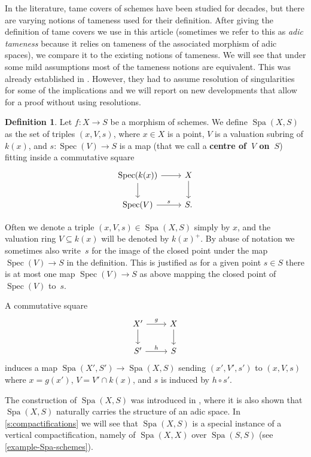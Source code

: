 \documentclass[a4paper,twoside,11pt,reqno]{amsart}
\DeclareMathOperator{\Spec}{Spec}
\DeclareMathOperator{\Spa}{Spa}
\theoremstyle{definition}
\newtheorem{defi}[thm]{Definition}
\numberwithin{equation}{subsection}
\begin{document}
In the literature, tame covers of schemes have been studied for decades, but there are varying notions of tameness used for their definition. 
After giving the definition of tame covers we use in this article (sometimes we refer to this as \emph{adic tameness} because it relies on tameness of the associated morphism of adic spaces), we compare it to the existing notions of tameness.
We will see that under some mild assumptions most of the tameness notions are equivalent.
This was already established in \cite{KerzSchmidt2010:DifferentNotionsTameness}.
However, they had to assume resolution of singularities for some of the implications and we will report on new developments that allow for a proof without using resolutions.

\begin{defi}
\label{defi:Spa for schemes}
Let $f\colon X\to S$ be a morphism of schemes. We define $\Spa(X,S)$ as the set of triples $(x,V,s)$, where $x \in X$ is a point, $V$ is a valuation subring of $k(x)$, and $s \colon \Spec(V) \to S$ is a map (that we call a \textbf{centre of~$V$ on~$S$}) fitting inside a commutative square
\[
 \begin{tikzcd}
     \Spec(k(x)) \ar[r] \ar[d] & X \ar[d] \\
     \Spec(V) \ar[r,"s"] & S.
 \end{tikzcd}
\]
\end{defi}

Often we denote a triple $(x,V,s)\in \Spa(X,S)$ simply by $x$, and the valuation ring $V\subseteq k(x)$ will be denoted by $k(x)^+$. By abuse of notation we sometimes also write~$s$ for the image of the closed point under the map $\Spec(V) \to S$ in the definition.
This is justified as for a given point $s \in S$ there is at most one map $\Spec(V) \to S$ as above mapping the closed point of~$\Spec(V)$ to~$s$.

    A commutative square 
    \[ 
        \begin{tikzcd}
            X'\ar[d] \ar[r,"g"] & X\ar[d] \\
            S'\ar[r,"h"] & S
        \end{tikzcd}
    \]
    induces a map $\Spa(X', S')\to \Spa(X, S)$ sending $(x', V',s')$ to $(x,V,s)$ where $x=g(x')$, $V = V'\cap k(x)$, and $s$ is induced by $h\circ s'$.

The construction of $\Spa(X,S)$ was introduced in \cite[\S~3.1]{Temkin2011:RelativeRiemannZariskiSpacesa}, where it is also shown that $\Spa(X,S)$ naturally carries the structure of an adic space.
In \cref{s:compactifications} we will see that $\Spa(X,S)$ is a special instance of a vertical compactification, namely of $\Spa(X,X)$ over $\Spa(S,S)$ (see \cref{example-Spa-schemes}).
\end{document}
